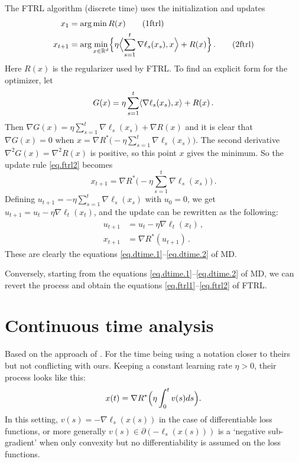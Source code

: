 \documentclass[12pt]{article}
\theoremstyle{plain}
\theoremstyle{definition}
\theoremstyle{remark}
\begin{document}
The FTRL algorithm (discrete time) uses the initialization and updates
\begin{align}
x_1 &= \arg\min R(x) \label{eq.ftrl1} \tag{1ftrl} \\
x_{t+1} &= \arg\min_{x \in \mathbb{R}^d} \Bigl\{ \eta \Bigl\langle { \sum_{s=1}^{t} \nabla\ell_s(x_{s}), x} \Bigr\rangle + R(x)\Bigr\}\,.
 \label{eq.ftrl2} 
\tag{2ftrl}
\end{align}
Here $R(x)$ is the regularizer used by FTRL.
To find an explicit form for the optimizer, let
$$
G(x) = \eta \sum_{s=1}^{t} \langle { \nabla\ell_s(x_{s}), x}\rangle + R(x)\,.
$$
Then $\nabla G(x) = \eta \sum_{s=1}^{t} \nabla\ell_s(x_{s}) + \nabla R(x)$
and it is clear that $\nabla G(x) = 0$ 
when $x = \nabla R^{*} \bigl( -\eta \sum_{s=1}^{t} \nabla\ell_s(x_{s}) \bigr)$.
The second derivative $\nabla^2 G(x) = \nabla^2 R(x)$ is positive,
so this point $x$ gives the minimum.
So the update rule \eqref{eq.ftrl2} becomes
$$
x_{t+1} = \nabla R^{*} \bigl( -\eta \sum_{s=1}^{t} \nabla\ell_s(x_{s}) \bigr)\,.
$$
Defining $u_{t+1} = -\eta \sum_{s=1}^{t} \nabla\ell_s(x_{s})$ with $u_{0} = 0$,
we get $u_{t+1} = u_{t} - \eta \nabla\ell_t(x_{t})$,
and the update can be rewritten as the following:
\begin{align*}
u_{t+1} &= u_{t} - \eta \nabla \ell_{t}(x_{t})\,, \\
x_{t+1} &= \nabla R^{*}(u_{t+1})\,. 
\end{align*}
These are clearly the equations \eqref{eq.dtime.1}--\eqref{eq.dtime.2} of MD.

\medskip

Conversely, starting from the equations \eqref{eq.dtime.1}--\eqref{eq.dtime.2} of MD,
we can revert the process and obtain the equations \eqref{eq.ftrl1}--\eqref{eq.ftrl2} of FTRL.


\medskip


\section*{Continuous time analysis}

Based on the approach of \cite[Section 4]{Kwon-M}.
For the time being using a notation closer to theirs but not conflicting with ours.
Keeping a constant learning rate $\eta > 0$, their process looks like this:
\begin{align*}
x(t) = \nabla R^{*} \Bigl( \eta \int_{0}^{t} v(s) ds \Bigr).
\end{align*}
In this setting, $v(s) = -\nabla \ell_{s}(x(s))$ in the case of differentiable loss functions,
or more generally $v(s) \in \partial (-\ell_{s}(x(s)))$ is a `negative sub-gradient'
when only convexity but no differentiability is assumed on the loss functions.
\end{document}

